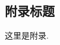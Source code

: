 \documentclass[12pt, a4paper, oneside]{ctexart}
\begin{document}
\newpage

\printbibliography[title=参考文献]

\begin{appendices}
    \renewcommand{\thesection}{\Alph{section}}
    \section{附录标题}
    这里是附录.
\end{appendices}
\end{document}
